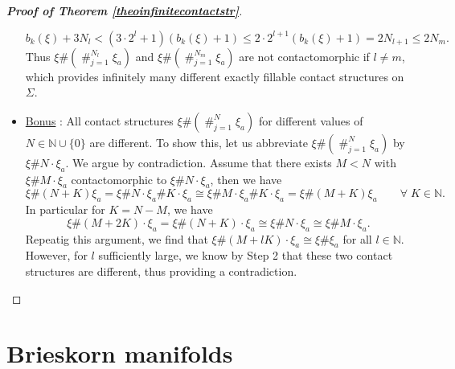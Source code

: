 \documentclass[a4paper,12pt,bibliography=totocnumbered,titlepage=false,abstracton,bookmarksnumbered=true]{scrartcl}
\DeclareMathOperator*{\consumt}{\#}
\theoremstyle{definition}
\begin{document}
\begin{proof}[\textnormal{\textbf{Proof of Theorem \ref{theoinfinitecontactstr}}}]
\begin{itemize}
   \[b_k(\xi)+3N_l<(3{\cdot}2^l+1)(b_k(\xi)+1)\leq 2{\cdot}2^{l+1}(b_k(\xi)+1)=2N_{l+1}\leq 2N_m.\]
   Thus $\xi \#(\consumt_{j=1}^{N_l} \xi_a)$ and $\xi \#(\consumt_{j=1}^{N_m} \xi_a)$ are not contactomorphic if $l\neq m$, which provides infinitely many different exactly fillable contact structures on $\Sigma$.
   \item \underline{Bonus} : All contact structures $\xi \#(\consumt_{j=1}^N \xi_a)$ for different values of $N\in\mathbb{N}{\cup}\{0\}$ are different. To show this, let us abbreviate $\xi \#(\consumt_{j=1}^N \xi_a)$ by $\xi\#N{\cdot}\xi_a$. We argue by contradiction. Assume that there exists $M<N$ with $\xi\#M{\cdot}\xi_a$ contactomorphic to $\xi\#N{\cdot}\xi_a$, then we have
   \[\xi\#(N{+}K)\xi_a=\xi\# N{\cdot}\xi_a\#K{\cdot}\xi_a \cong \xi\# M{\cdot}\xi_a\#K{\cdot}\xi_a=\xi\#(M{+}K)\xi_a\qquad \forall \;K{\in}\mathbb{N}.\]
   In particular for $K=N{-}M$, we have
   \[\xi\#(M{+}2K){\cdot}\xi_a=\xi\#(N{+}K){\cdot}\xi_a\cong\xi\#N{\cdot}\xi_a\cong\xi\#M{\cdot}\xi_a.\]
   Repeatig this argument, we find that $\xi\#(M{+}lK){\cdot}\xi_a\cong\xi\#\xi_a$ for all $l\in\mathbb{N}$. However, for $l$ sufficiently large, we know by Step 2 that these two contact structures are different, thus providing a contradiction.\qedhere 
\end{itemize}
\end{proof}


\section{Brieskorn manifolds}\label{secBries}
\end{document}
